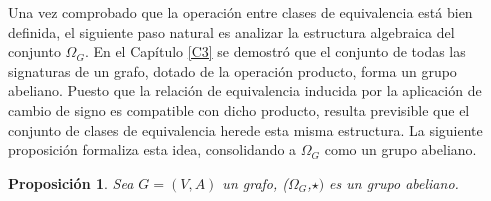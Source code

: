 \documentclass[11pt,a4paper,spanish]{report}
\theoremstyle{plain}
\newtheorem{proposicion}[teorema]{Proposición}
\begin{document}
Una vez comprobado que la operación entre clases de equivalencia está bien definida, el siguiente paso natural es analizar la estructura algebraica del conjunto $\Omega_G$. En el Capítulo \ref{C3} se demostró que el conjunto de todas las signaturas de un grafo, dotado de la operación producto, forma un grupo abeliano. Puesto que la relación de equivalencia inducida por la aplicación de cambio de signo es compatible con dicho producto, resulta previsible que el conjunto de clases de equivalencia herede esta misma estructura. La siguiente proposición formaliza esta idea, consolidando a $\Omega_G$ como un grupo abeliano.




\begin{proposicion}\label{teo:3.10}
Sea $G=(V,A)$ un grafo, ($\Omega_G$,$\star)$ es un grupo abeliano. 
\end{proposicion}
\end{document}
